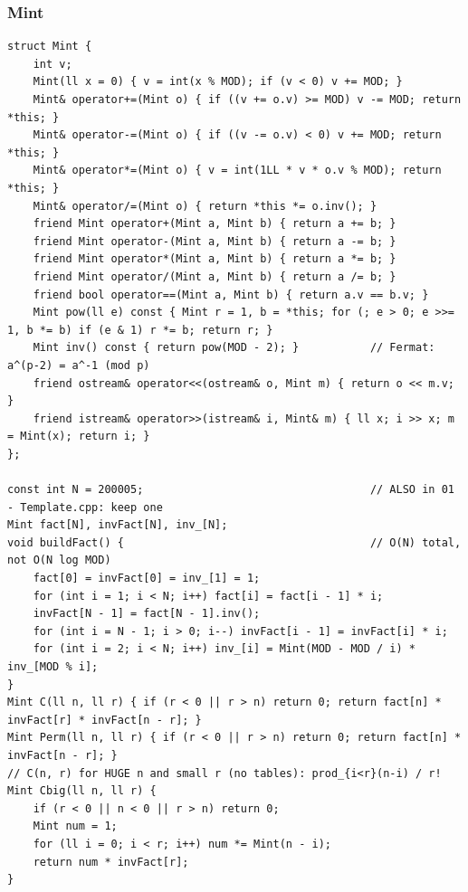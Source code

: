 \documentclass[9pt,a4paper,twocolumn]{extarticle}
\begin{document}
\filbreak
\subsubsection{Mint}
\nopagebreak
\begin{lstlisting}
struct Mint {
    int v;
    Mint(ll x = 0) { v = int(x % MOD); if (v < 0) v += MOD; }
    Mint& operator+=(Mint o) { if ((v += o.v) >= MOD) v -= MOD; return *this; }
    Mint& operator-=(Mint o) { if ((v -= o.v) < 0) v += MOD; return *this; }
    Mint& operator*=(Mint o) { v = int(1LL * v * o.v % MOD); return *this; }
    Mint& operator/=(Mint o) { return *this *= o.inv(); }
    friend Mint operator+(Mint a, Mint b) { return a += b; }
    friend Mint operator-(Mint a, Mint b) { return a -= b; }
    friend Mint operator*(Mint a, Mint b) { return a *= b; }
    friend Mint operator/(Mint a, Mint b) { return a /= b; }
    friend bool operator==(Mint a, Mint b) { return a.v == b.v; }
    Mint pow(ll e) const { Mint r = 1, b = *this; for (; e > 0; e >>= 1, b *= b) if (e & 1) r *= b; return r; }
    Mint inv() const { return pow(MOD - 2); }           // Fermat: a^(p-2) = a^-1 (mod p)
    friend ostream& operator<<(ostream& o, Mint m) { return o << m.v; }
    friend istream& operator>>(istream& i, Mint& m) { ll x; i >> x; m = Mint(x); return i; }
};

const int N = 200005;                                   // ALSO in 01 - Template.cpp: keep one
Mint fact[N], invFact[N], inv_[N];
void buildFact() {                                      // O(N) total, not O(N log MOD)
    fact[0] = invFact[0] = inv_[1] = 1;
    for (int i = 1; i < N; i++) fact[i] = fact[i - 1] * i;
    invFact[N - 1] = fact[N - 1].inv();
    for (int i = N - 1; i > 0; i--) invFact[i - 1] = invFact[i] * i;
    for (int i = 2; i < N; i++) inv_[i] = Mint(MOD - MOD / i) * inv_[MOD % i];
}
Mint C(ll n, ll r) { if (r < 0 || r > n) return 0; return fact[n] * invFact[r] * invFact[n - r]; }
Mint Perm(ll n, ll r) { if (r < 0 || r > n) return 0; return fact[n] * invFact[n - r]; }
// C(n, r) for HUGE n and small r (no tables): prod_{i<r}(n-i) / r!
Mint Cbig(ll n, ll r) {
    if (r < 0 || n < 0 || r > n) return 0;
    Mint num = 1;
    for (ll i = 0; i < r; i++) num *= Mint(n - i);
    return num * invFact[r];
}
\end{lstlisting}
\end{document}
